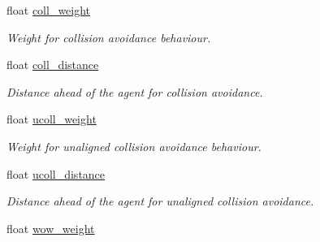 \begin{DoxyCompactItemize}
\mbox{\label{classphysim_1_1particles_1_1agent__particle_af026f67b9cd8c190fdee03ef143d6e83}} 
float \hyperlink{classphysim_1_1particles_1_1agent__particle_af026f67b9cd8c190fdee03ef143d6e83}{coll\+\_\+weight}
\begin{DoxyCompactList}\small\item\em Weight for collision avoidance behaviour. \end{DoxyCompactList}\item 
\mbox{\label{classphysim_1_1particles_1_1agent__particle_ae851f1172de706931eebf33b642983e8}} 
float \hyperlink{classphysim_1_1particles_1_1agent__particle_ae851f1172de706931eebf33b642983e8}{coll\+\_\+distance}
\begin{DoxyCompactList}\small\item\em Distance ahead of the agent for collision avoidance. \end{DoxyCompactList}\item 
\mbox{\label{classphysim_1_1particles_1_1agent__particle_ab25fc01e8a49f57aca2be031f048edea}} 
float \hyperlink{classphysim_1_1particles_1_1agent__particle_ab25fc01e8a49f57aca2be031f048edea}{ucoll\+\_\+weight}
\begin{DoxyCompactList}\small\item\em Weight for unaligned collision avoidance behaviour. \end{DoxyCompactList}\item 
\mbox{\label{classphysim_1_1particles_1_1agent__particle_abe0c2e35c753ee40c5fb9408932d6513}} 
float \hyperlink{classphysim_1_1particles_1_1agent__particle_abe0c2e35c753ee40c5fb9408932d6513}{ucoll\+\_\+distance}
\begin{DoxyCompactList}\small\item\em Distance ahead of the agent for unaligned collision avoidance. \end{DoxyCompactList}\item 
\mbox{\label{classphysim_1_1particles_1_1agent__particle_acc82ad218207d618d25128ac4a885e11}} 
float \hyperlink{classphysim_1_1particles_1_1agent__particle_acc82ad218207d618d25128ac4a885e11}{wow\+\_\+weight}

\end{DoxyCompactItemize}
